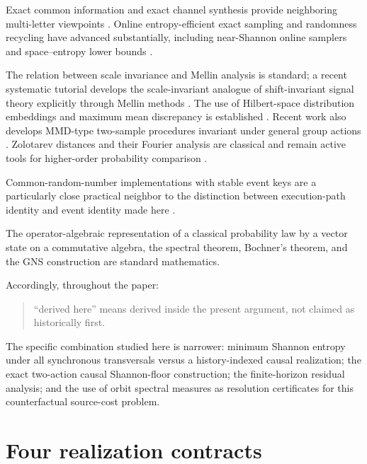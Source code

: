 \documentclass[11pt,a4paper]{article}
\newcommand{\1}{\mathbf 1}
\begin{document}
Exact common information and exact channel synthesis provide neighboring
multi-letter viewpoints \cite{KumarLiElGamal,YuTanExact}.
Online entropy-efficient exact sampling and randomness recycling have
advanced substantially, including near-Shannon online samplers and
space--entropy lower bounds \cite{DraperSaad2026,DraperHarrisSaad2026,
DraperSaadSpace2026}.

The relation between scale invariance and Mellin analysis is standard;
a recent systematic tutorial develops the scale-invariant analogue of
shift-invariant signal theory explicitly through Mellin methods
\cite{GuptaSinghAggarwalJoshi2025}.
The use of Hilbert-space distribution embeddings and maximum mean
discrepancy is established \cite{Sriperumbudur2010,Gretton2012}.
Recent work also develops MMD-type two-sample procedures invariant under
general group actions \cite{GiacofciMeynaouiPodgorny2026}.
Zolotarev distances and their Fourier analysis are classical and remain
active tools for higher-order probability comparison
\cite{BobkovLedoux2026}.

Common-random-number implementations with stable event keys are a
particularly close practical neighbor to the distinction between
execution-path identity and event identity made here
\cite{BuffaloPearsonKlein2026}.

The operator-algebraic representation of a classical probability law by
a vector state on a commutative algebra, the spectral theorem, Bochner's
theorem, and the GNS construction are standard mathematics.

Accordingly, throughout the paper:
\begin{quote}
``derived here'' means derived inside the present argument, not claimed
as historically first.
\end{quote}

The specific combination studied here is narrower:
minimum Shannon entropy under all synchronous transversals versus a
history-indexed causal realization; the exact two-action causal
Shannon-floor construction; the finite-horizon residual analysis; and
the use of orbit spectral measures as resolution certificates for this
counterfactual source-cost problem.


\section{Four realization contracts}
\end{document}

